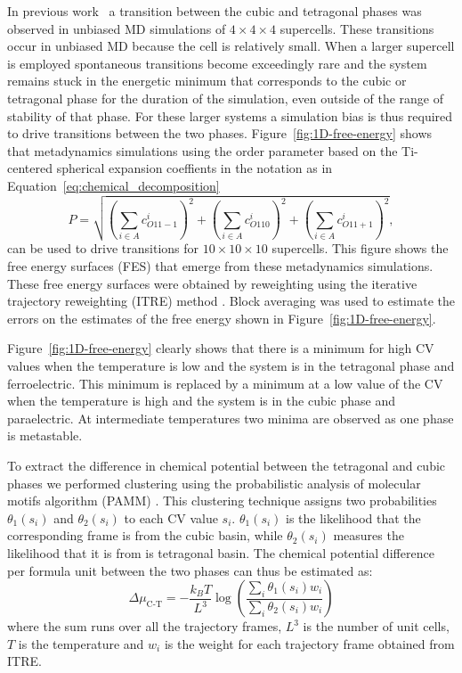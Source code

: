 In previous work~\cite{gigli_thermodynamics_2022} a transition between the cubic and tetragonal phases was observed in unbiased MD simulations of $4\times4\times4$ supercells.  These transitions occur in unbiased MD because the cell is relatively small.  When a larger supercell is employed spontaneous transitions become exceedingly rare and the system remains stuck in the energetic minimum that corresponds to the cubic or tetragonal phase for the duration of the simulation, even outside of the range of stability of that phase.  For these larger systems a simulation bias is thus required to drive transitions between the two phases. Figure~\ref{fig:1D-free-energy} shows that metadynamics simulations using the order parameter based on the Ti-centered spherical expansion coeffients in the notation as in Equation~\eqref{eq:chemical_decomposition}
\begin{equation}
  P = \sqrt{(\sum_{i\in A} c_{O11-1}^i)^2 + (\sum_{i\in A} c_{O110}^i)^2 + (\sum_{i\in A} c_{O11+1}^i)^2}, 
\end{equation}
can be used to drive  transitions for $10\times10\times10$ supercells. This figure shows the free energy surfaces (FES) that emerge from these metadynamics simulations. These free energy surfaces were obtained by reweighting using the iterative trajectory reweighting (ITRE) method \cite{giberti_iterative_2020}.  Block averaging was used to estimate the errors on the estimates of the free energy shown in Figure~\ref{fig:1D-free-energy}. 

Figure~\ref{fig:1D-free-energy} clearly shows that there is a minimum for high CV values when the temperature is low and the system is in the tetragonal phase and ferroelectric. This minimum is replaced by a minimum at a low value of the CV when the temperature is high and the system is in the cubic phase and paraelectric.  At intermediate temperatures two minima are observed as one phase is metastable.

To extract the difference in chemical potential between the tetragonal and cubic phases we performed clustering using the probabilistic analysis of molecular motifs algorithm (PAMM) \cite{gasp+18jctc}. This clustering technique assigns two probabilities $\theta_1(s_i)$ and $\theta_2(s_i)$ to each CV value $s_i$.  $\theta_1(s_i)$ is the likelihood that the corresponding frame is from the cubic basin, while  $\theta_2(s_i)$ measures the likelihood that it is from is tetragonal basin. The chemical potential difference per formula unit between the two phases can thus be estimated as:
$$
\Delta\mu_{\textrm{C-T}} = -\frac{k_B T}{L^3} \log \left( \frac{\sum_i \theta_1(s_i) w_i}{\sum_i \theta_2(s_i) w_i} \right) 
$$
where the sum runs over all the trajectory frames, $L^3$ is the number of unit cells, $T$ is the temperature and $w_i$ is the weight for each trajectory frame obtained from ITRE.  

